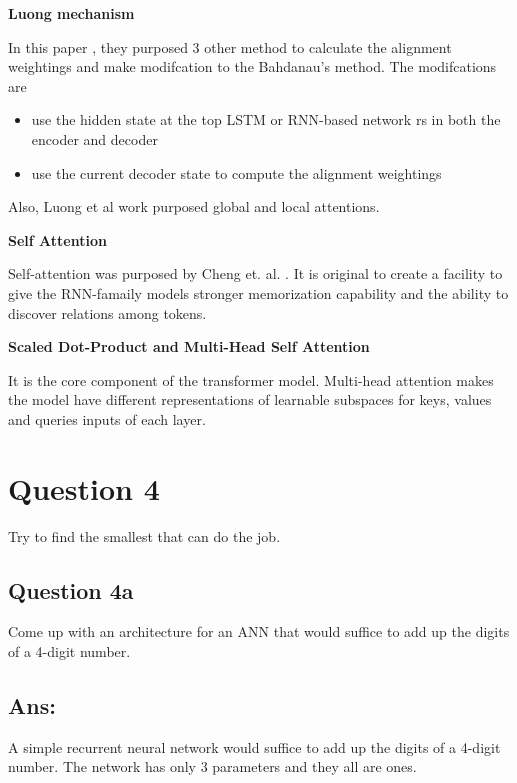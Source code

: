 \documentclass{kthreport}
\begin{document}
\textbf{Luong mechanism}

In this paper \cite{luong-etal-2015-effective}, they purposed 3 other method to calculate the alignment weightings
and make modifcation to the Bahdanau's method. The modifcations are
\begin{itemize}
    \item use the hidden state at the top LSTM or RNN-based network rs in both the encoder and decoder
    \item use the current decoder state to compute the alignment weightings
\end{itemize}

Also, Luong et al work \cite{luong-etal-2015-effective} purposed global and local attentions.

\textbf{Self Attention}

Self-attention was purposed by Cheng et. al. \cite{cheng-etal-2016-long}. It is
original to create a facility to give the RNN-famaily models stronger memorization
capability and the ability to discover relations among tokens.

\textbf{Scaled Dot-Product and Multi-Head Self Attention}

It is the core component of the transformer model. \cite{vaswani2017attention}
Multi-head attention makes the model have different representations of
learnable subspaces for keys, values and queries inputs of each layer.




\section{Question 4}
Try to find the smallest that can do the job.

\subsection{Question 4a}
Come up with an architecture for an ANN that would suffice to add up the digits of a 4-digit number.

\subsection*{Ans:}
A simple recurrent neural network would suffice to add up the digits of a 4-digit number.
The network has only 3 parameters and they all are ones.
\end{document}
